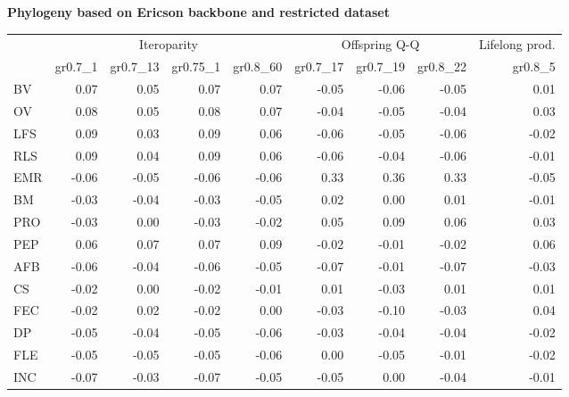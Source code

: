 \begin{landscape}
\begin{table}
\begin{footnotesize}
\textbf{Phylogeny based on Ericson backbone and restricted dataset}

\begin{tabular}{@{}l|rrrr|rrr|r@{}}
\toprule
 & \multicolumn{4}{c|}{Iteroparity} & \multicolumn{3}{c|}{Offspring Q-Q} & \multicolumn{1}{c}{Lifelong prod.}\\
 & gr0.7\_1 & gr0.7\_13 & gr0.75\_1 & gr0.8\_60 & gr0.7\_17 & gr0.7\_19 & gr0.8\_22 & gr0.8\_5\\
\midrule
BV & 0.07 & 0.05 & 0.07 & 0.07 & -0.05 & -0.06 & -0.05 & 0.01\\
OV & 0.08 & 0.05 & 0.08 & 0.07 & -0.04 & -0.05 & -0.04 & 0.03\\
LFS & 0.09 & 0.03 & 0.09 & 0.06 & -0.06 & -0.05 & -0.06 & -0.02\\
RLS & 0.09 & 0.04 & 0.09 & 0.06 & -0.06 & -0.04 & -0.06 & -0.01\\
EMR & -0.06 & -0.05 & -0.06 & -0.06 & 0.33 & 0.36 & 0.33 & -0.05\\
BM & -0.03 & -0.04 & -0.03 & -0.05 & 0.02 & 0.00 & 0.01 & -0.01\\
PRO & -0.03 & 0.00 & -0.03 & -0.02 & 0.05 & 0.09 & 0.06 & 0.03\\
PEP & 0.06 & 0.07 & 0.07 & 0.09 & -0.02 & -0.01 & -0.02 & 0.06\\
AFB & -0.06 & -0.04 & -0.06 & -0.05 & -0.07 & -0.01 & -0.07 & -0.03\\
CS & -0.02 & 0.00 & -0.02 & -0.01 & 0.01 & -0.03 & 0.01 & 0.01\\
FEC & -0.02 & 0.02 & -0.02 & 0.00 & -0.03 & -0.10 & -0.03 & 0.04\\
DP & -0.05 & -0.04 & -0.05 & -0.06 & -0.03 & -0.04 & -0.04 & -0.02\\
FLE & -0.05 & -0.05 & -0.05 & -0.06 & 0.00 & -0.05 & -0.01 & -0.02\\
INC & -0.07 & -0.03 & -0.07 & -0.05 & -0.05 & 0.00 & -0.04 & -0.01\\
\bottomrule
\end{tabular}
\end{footnotesize}
\end{table}


\clearpage%

\begin{table}
\center
\begin{footnotesize}


\end{footnotesize}
\end{table}
\end{landscape}

